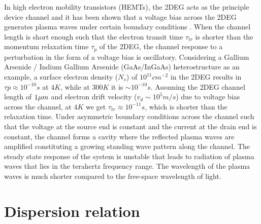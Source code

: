 \documentclass[11pt]{article}
\begin{document}
In high electron mobility transistors (HEMTs), the 2DEG acts as the principle device channel and it has been shown that a voltage bias across the 2DEG generates plasma waves under certain boundary conditions \cite{Dyakonov_1993}. When the channel length is short enough such that the electron transit time $\tau_{tr}$ is shorter than the momentum relaxation time $\tau_{p}$ of the 2DEG, the channel response to a perturbation in the form of a voltage bias is  oscillatory. Considering a Gallium Arsenide / Indium Gallium Arsenide (GaAs/InGaAs) heterostructure as an example, a surface electron density ($N_s$) of $10^{11} cm^{-2}$ in the 2DEG results in $\tau{p} \approx 10^{-10} s$ at $4 K$, while at $300 K$ it is $\sim 10^{-10} s$. Assuming the 2DEG channel length of $1 \mu m$ and electron drift velocity ($v_d \sim 10^5 m/s$) due to voltage bias across the channel, at $4 K$ we get $\tau_{tr} \approx 10^{-11} s$, which is shorter than the relaxation time. Under asymmetric boundary conditions across the channel such that the voltage at the source end is constant and the current at the drain end is constant, the channel forms a cavity where the reflected plasma waves are amplified constituting a growing standing wave pattern along the channel. The steady state response of the system is unstable that leads to radiation of plasma waves that lies in the terahertz frequency range. The wavelength of the plasma waves is much shorter compared to the free-space wavelength of light.

\section{Dispersion relation}
\end{document}
